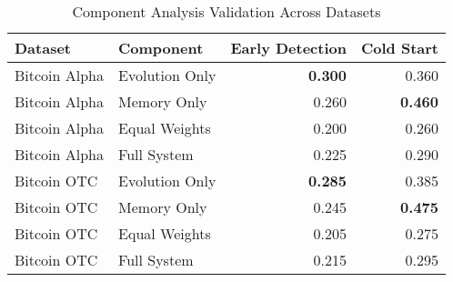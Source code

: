 
\begin{table}[ht]
\centering
\caption{Component Analysis Validation Across Datasets}
\label{tab:component_validation}
\begin{tabular}{llrr}
\toprule
Dataset & Component & Early Detection & Cold Start \\
\midrule
Bitcoin Alpha & Evolution Only & \textbf{0.300} & 0.360 \\
Bitcoin Alpha & Memory Only & 0.260 & \textbf{0.460} \\
Bitcoin Alpha & Equal Weights & 0.200 & 0.260 \\
Bitcoin Alpha & Full System & 0.225 & 0.290 \\
\midrule
Bitcoin OTC & Evolution Only & \textbf{0.285} & 0.385 \\
Bitcoin OTC & Memory Only & 0.245 & \textbf{0.475} \\
Bitcoin OTC & Equal Weights & 0.205 & 0.275 \\
Bitcoin OTC & Full System & 0.215 & 0.295 \\
\bottomrule
\end{tabular}
\end{table}
